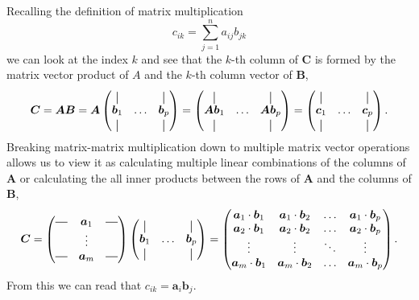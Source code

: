 Recalling the definition of matrix multiplication 
\begin{equation}
    c_{ik} = \sum_{j=1}^n a_{ij} b_{jk}
\end{equation}
we can look at the index $k$ and see that the $k$-th column of $\bm{C}$ is formed by the matrix vector product of $A$ and 
the $k$-th column vector of $\bm{B}$,
\begin{equation}
    \bm{C} = \bm{AB} = \bm{A} \begin{pmatrix}
    \vertbar &        & \vertbar \\
    \bm{b}_1 & \hdots & \bm{b}_p \\
    \vertbar &        & \vertbar 
    \end{pmatrix} = 
    \begin{pmatrix}
        \vertbar &        & \vertbar \\
        \bm{A}\bm{b}_1 & \hdots & \bm{A}\bm{b}_p \\
        \vertbar &        & \vertbar 
    \end{pmatrix} = 
\begin{pmatrix}
\vertbar &        & \vertbar \\
\bm{c}_1 & \hdots & \bm{c}_p \\
\vertbar &        & \vertbar 
\end{pmatrix}.
\end{equation}
Breaking matrix-matrix multiplication down to multiple matrix vector operations
allows us to view it as calculating multiple linear combinations of the columns of $\bm{A}$
or calculating the all inner products between the rows of $\bm{A}$ and the columns of $\bm{B}$,
\begin{equation}
    \bm{C} = \begin{pmatrix}
        \horzbar & \bm{a}_1 & \horzbar \\
                  & \vdots   &  \\
        \horzbar & \bm{a}_m &  \horzbar \\
    \end{pmatrix} 
    \begin{pmatrix}
    \vertbar &        & \vertbar \\
    \bm{b}_1 & \hdots & \bm{b}_p \\
    \vertbar &        & \vertbar 
    \end{pmatrix} = 
    \begin{pmatrix}
        \bm{a}_{1} \cdot \bm{b}_1 & \bm{a}_{1} \cdot \bm{b}_2 & \hdots & \bm{a}_{1} \cdot \bm{b}_p  \\
        \bm{a}_{2} \cdot \bm{b}_1 & \bm{a}_{2} \cdot \bm{b}_2 & \hdots & \bm{a}_{2} \cdot \bm{b}_p  \\
        \vdots                    & \vdots                    & \ddots & \vdots                     \\
        \bm{a}_{m} \cdot \bm{b}_1 & \bm{a}_{m} \cdot \bm{b}_2 & \hdots & \bm{a}_{m} \cdot \bm{b}_p  \\
    \end{pmatrix}.
\end{equation}
From this we can read that $c_{ik} = \bm{a}_i \bm{b}_j$.

